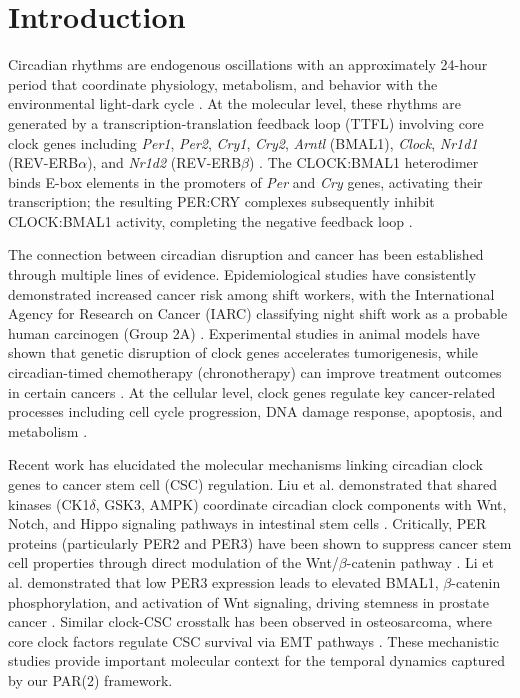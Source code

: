 \documentclass[11pt,a4paper]{article}
\begin{document}
\newpage

\section{Introduction}

Circadian rhythms are endogenous oscillations with an approximately 24-hour period that coordinate physiology, metabolism, and behavior with the environmental light-dark cycle \citep{bass2010circadian, takahashi2017transcriptional}. At the molecular level, these rhythms are generated by a transcription-translation feedback loop (TTFL) involving core clock genes including \textit{Per1}, \textit{Per2}, \textit{Cry1}, \textit{Cry2}, \textit{Arntl} (BMAL1), \textit{Clock}, \textit{Nr1d1} (REV-ERB$\alpha$), and \textit{Nr1d2} (REV-ERB$\beta$) \citep{reppert2002coordination, lowrey2011genetics}. The CLOCK:BMAL1 heterodimer binds E-box elements in the promoters of \textit{Per} and \textit{Cry} genes, activating their transcription; the resulting PER:CRY complexes subsequently inhibit CLOCK:BMAL1 activity, completing the negative feedback loop \citep{gekakis1998role, kume1999mcry1}.

The connection between circadian disruption and cancer has been established through multiple lines of evidence. Epidemiological studies have consistently demonstrated increased cancer risk among shift workers, with the International Agency for Research on Cancer (IARC) classifying night shift work as a probable human carcinogen (Group 2A) \citep{straif2007carcinogenicity, schernhammer2003night}. Experimental studies in animal models have shown that genetic disruption of clock genes accelerates tumorigenesis, while circadian-timed chemotherapy (chronotherapy) can improve treatment outcomes in certain cancers \citep{fu2003circadian, lee2010disrupting, levi2010circadian}. At the cellular level, clock genes regulate key cancer-related processes including cell cycle progression, DNA damage response, apoptosis, and metabolism \citep{matsuo2003control, gery2006circadian, masri2015circadian}.

Recent work has elucidated the molecular mechanisms linking circadian clock genes to cancer stem cell (CSC) regulation. Liu et al. demonstrated that shared kinases (CK1$\delta$, GSK3, AMPK) coordinate circadian clock components with Wnt, Notch, and Hippo signaling pathways in intestinal stem cells \citep{liu2025genesdiseases}. Critically, PER proteins (particularly PER2 and PER3) have been shown to suppress cancer stem cell properties through direct modulation of the Wnt/$\beta$-catenin pathway \citep{cellcommsignal2025per, li2021per3wnt}. Li et al. demonstrated that low PER3 expression leads to elevated BMAL1, $\beta$-catenin phosphorylation, and activation of Wnt signaling, driving stemness in prostate cancer \citep{li2021per3wnt}. Similar clock-CSC crosstalk has been observed in osteosarcoma, where core clock factors regulate CSC survival via EMT pathways \citep{osteosarcoma2025cells}. These mechanistic studies provide important molecular context for the temporal dynamics captured by our PAR(2) framework.
\end{document}
